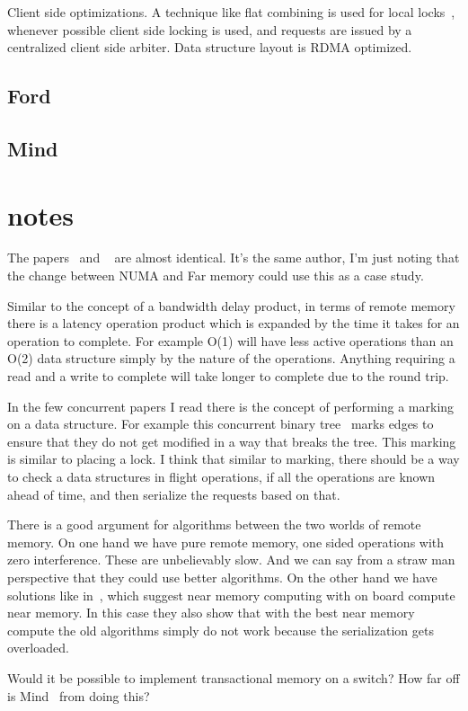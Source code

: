 Client side optimizations. A technique like flat combining is used for local
locks~\cite{flat-combine}, whenever possible client side locking is used, and
requests are issued by a centralized client side arbiter. Data structure layout is RDMA optimized.

\subsection{Ford}

\subsection{Mind}

\section{notes}

The papers~\cite{one-sided-hash} and ~\cite{write-optimized-hash} are almost
identical. It's the same author, I'm just noting that the change between NUMA
and Far memory could use this as a case study.

Similar to the concept of a bandwidth delay product, in terms of remote memory
there is a latency operation product which is expanded by the time it takes for
an operation to complete. For example O(1) will have less active operations than
an O(2) data structure simply by the nature of the operations. Anything requiring
a read and a write to complete will take longer to complete due to the round
trip.

In the few concurrent papers I read there is the concept of performing a marking
on a data structure. For example this concurrent binary
tree~\cite{fast-concurrent-bin} marks edges to ensure that they do not get
modified in a way that breaks the tree. This marking is similar to placing a
lock. I think that similar to marking, there should be a way to check a data
structures in flight operations, if all the operations are known ahead of time,
and then serialize the requests based on that.

There is a good argument for algorithms between the two worlds of remote memory.
On one hand we have pure remote memory, one sided operations with zero
interference. These are unbelievably slow. And we can say from a straw man
perspective that they could use better algorithms. On the other hand we have
solutions like in~\cite{design-far-memory-struct,near-memory-structs}, which
suggest near memory computing with on board compute near memory. In this case
they also show that with the best near memory compute the old algorithms simply
do not work because the serialization gets overloaded.

Would it be possible to implement transactional memory on a switch? How far off
is Mind~\cite{mind} from doing this?






